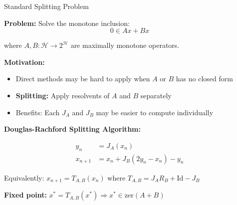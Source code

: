 \documentclass[aspectratio=169,10pt]{beamer}
\begin{document}
\begin{frame}{Standard Splitting Problem}

\textbf{Problem:} Solve the monotone inclusion:
\[ 0 \in Ax + Bx \]

where $A, B: \mathcal{H} \to 2^{\mathcal{H}}$ are maximally monotone operators.

\vspace{0.3cm}
\textbf{Motivation:}
\begin{itemize}
  \item Direct methods may be hard to apply when $A$ or $B$ has no closed form
  \item \textbf{Splitting:} Apply resolvents of $A$ and $B$ separately
  \item Benefits: Each $J_A$ and $J_B$ may be easier to compute individually
\end{itemize}

\vspace{0.3cm}
\textbf{Douglas-Rachford Splitting Algorithm:}

\begin{align*}
  y_n &= J_A(x_n) \\
  x_{n+1} &= x_n + J_B(2y_n - x_n) - y_n
\end{align*}

Equivalently: $x_{n+1} = T_{A,B}(x_n)$ where $T_{A,B} = J_A R_B + \text{Id} - J_B$

\vspace{0.3cm}
\textbf{Fixed point:} $x^* = T_{A,B}(x^*) \Rightarrow x^* \in \text{zer}(A + B)$

\end{frame}
\end{document}
